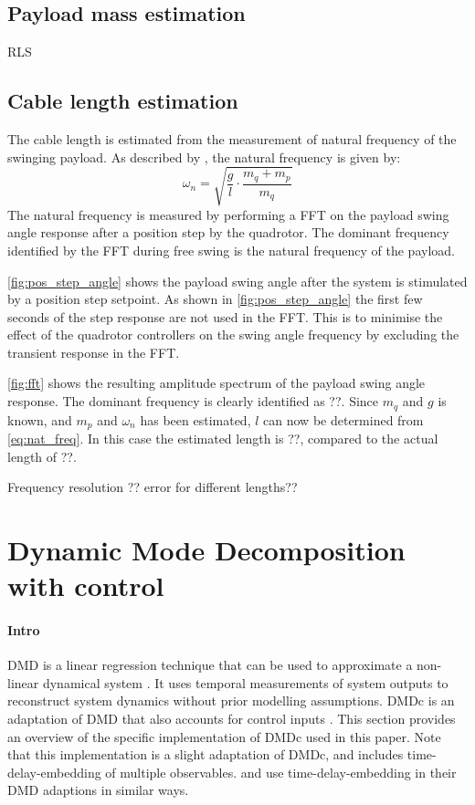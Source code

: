    \subsection{Payload mass estimation}
        RLS

    \subsection{Cable length estimation}
        The cable length is estimated from the measurement of natural frequency of the swinging payload.
        As described by
        \cite{bisgaard},
        the natural frequency is given by:
        \begin{equation} \label{eq:nat_freq}
            \omega_n = \sqrt{ \frac{g}{l} \cdot \frac{m_q + m_p}{m_q}}
        \end{equation}
        The natural frequency is measured by performing a FFT on the payload swing angle response after a position step by the quadrotor.
        The dominant frequency identified by the FFT during free swing is the natural frequency of the payload.
        
        \ref{fig:pos_step_angle}
        shows the payload swing angle after the system is stimulated by a position step setpoint.
        As shown in 
        \ref{fig:pos_step_angle}
        the first few seconds of the step response are not used in the FFT.
        This is to minimise the effect of the quadrotor controllers on the swing angle frequency 
        by excluding the transient response in the FFT.

        \ref{fig:fft} 
        shows the resulting amplitude spectrum of the payload swing angle response.
        The dominant frequency is clearly identified as ??.
        Since $m_q$ and $g$ is known, and $m_p$ and $\omega_n$ has been estimated, $l$ can now be determined from
        \ref{eq:nat_freq}.
        In this case the estimated length is ??, compared to the actual length of ??.
        
        Frequency resolution ??
        error for different lengths??
  
\section{Dynamic Mode Decomposition with control}
\label{sec:dmdc}
    
    \paragraph{Intro}        
    DMD is a linear regression technique that can be used to approximate a non-linear dynamical system \cite{Tu2014}.
    It uses temporal measurements of system outputs to reconstruct system dynamics without prior modelling assumptions.
    DMDc is an adaptation of DMD that also accounts for control inputs \cite{Proctor2016c}.
    This section provides an overview of the specific implementation of DMDc used in this paper.        
    Note that this implementation is a slight adaptation of DMDc, and includes time-delay-embedding of multiple observables. 
    \cite{Korda2018b} and \cite{Arbabi2018} use time-delay-embedding in their DMD adaptions in similar ways.

